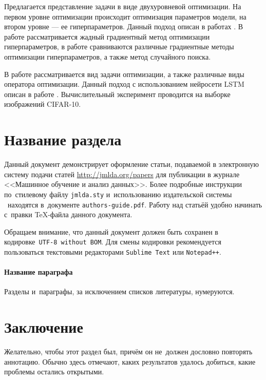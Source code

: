 \documentclass[12pt, twoside]{article}
\begin{document}
Предлагается представление задачи в виде двухуровневой оптимизации. На первом уровне оптимизации происходит оптимизация параметров модели, на втором уровне --- ее гиперпараметров. Данный подход описан в работах \cite{journals/corr/LuketinaBR15, journals/anor/BakhteevS20, journals/corr/MaclaurinDA15}. В работе \cite{journals/corr/LuketinaBR15} рассматривается жадный градиентный метод оптимизации гиперпараметров, в работе \cite{journals/anor/BakhteevS20} сравниваются различные градиентные методы оптимизации гиперпараметров, а также метод случайного поиска.

В работе рассматривается вид задачи оптимизации, а также различные виды оператора оптимизации. Данный подход с использованием нейросети LSTM описан в работе \cite{journals/corr/AndrychowiczDGH16}. Вычислительный эксперимент проводится на выборке изображений CIFAR-10.

\section{Название раздела}
Данный документ демонстрирует оформление статьи,
подаваемой в электронную систему подачи статей \url{http://jmlda.org/papers} для публикации в журнале <<Машинное обучение и анализ данных>>.
Более подробные инструкции по~стилевому файлу \texttt{jmlda.sty} и~использованию издательской системы \LaTeXe\
находятся в~документе \texttt{authors-guide.pdf}.
Работу над статьёй удобно начинать с~правки \TeX-файла данного документа.

Обращаем внимание, что данный документ должен быть сохранен в кодировке~\verb'UTF-8 without BOM'.
Для смены кодировки рекомендуется пользоваться текстовыми редакторами \verb'Sublime Text' или \verb'Notepad++'.

\paragraph{Название параграфа}
Разделы и~параграфы, за исключением списков литературы, нумеруются.

\section{Заключение}
Желательно, чтобы этот раздел был, причём он не~должен дословно повторять аннотацию.
Обычно здесь отмечают, каких результатов удалось добиться, какие проблемы остались открытыми.






\end{document}
